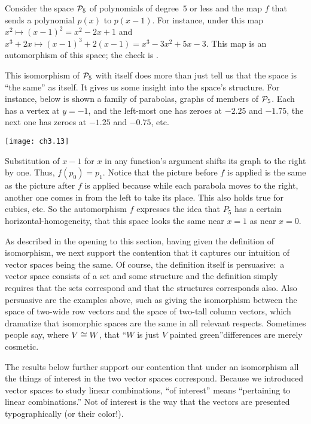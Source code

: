 \begin{example} \label{ex:OORThreeToFourLinCom}
Consider the space $\mathcal{P}_5$ of polynomials of degree~$5$
or less and the map $f$ that sends a polynomial $p(x)$ to $p(x-1)$.
For instance, under this map $x^2\mapsto (x-1)^2=x^2-2x+1$
and $x^3+2x\mapsto (x-1)^3+2(x-1)=x^3-3x^2+5x-3$.
This map is an automorphism of this space;
the check is .

This isomorphism of $\mathcal{P}_5$ with itself does more than just tell us
that the space is ``the same'' as itself.
It gives us some insight into the space's structure.
For instance, below is shown a family of parabolas, graphs of members of 
$\mathcal{P}_5$.
Each has a vertex at $y=-1$, and  
the left-most one has zeroes at $-2.25$ and $-1.75$, 
the next one has zeroes at $-1.25$ and $-0.75$, etc.
\begin{center}
  \texttt{[image: ch3.13]}                                
\end{center}
Substitution of \( x-1 \) for \( x \) in any function's
argument shifts its graph to the right by one.
Thus, $f(p_0)=p_1$.
Notice that the picture before $f$ is applied is the same as the 
picture after $f$ is applied because while each parabola moves to the 
right, another one comes in from the left to take its place.
This also holds true for cubics, etc.
So the automorphism $f$ expresses the idea that $P_5$  
has a certain
horizontal-homogeneity,
that this space looks the same near $x=1$ as near $x=0$. 
\end{example}

As described in the opening to this section, 
having given the definition of isomorphism, we next 
support the contention that it  
captures our intuition of vector spaces being the same.
Of course, the definition itself is persuasive:~a vector space 
consists of a set and some structure 
and the definition simply requires
that the sets correspond and that the structures corresponds also.
Also persuasive are the examples above, such as
giving the isomorphism between the space of two-wide row vectors and 
the space of two-tall column vectors, which
dramatize that isomorphic spaces are
the same in all relevant respects.
Sometimes people say, where \( V\cong W \), that ``\( W \) is just
\( V \) painted green''\Dash differences are merely cosmetic.

The results below further support our contention
that under an isomorphism
all the things of interest in the two vector spaces
correspond.
Because we introduced vector spaces to study linear combinations,
``of interest'' means ``pertaining to linear combinations.''
Not of interest is the way that the vectors are presented
typographically (or their color!).

